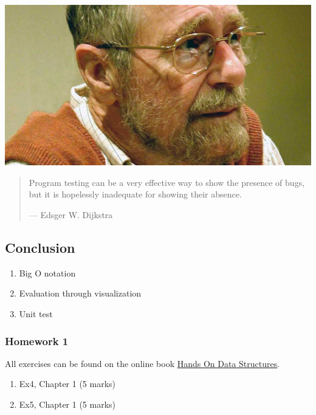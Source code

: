 \documentclass[aspectratio=169, 14pt]{beamer}
\begin{document}
\begin{frame}
    \begin{center}
        \includegraphics[height=.4\paperheight]{week2/dijkstra}
    \end{center}

   \begin{quote}
    Program testing can be a very effective way to show the presence of bugs, but it is hopelessly inadequate for showing their absence.
    \begin{flushright}
        --- Edsger W. Dijkstra
    \end{flushright}
   \end{quote} 

\end{frame}

\begin{frame}
    \section{\textcolor{darkmidnightblue}{Conclusion}}

    \begin{enumerate}
        \item Big O notation
        \item Evaluation through visualization
        \item Unit test
    \end{enumerate}
\end{frame}

\begin{frame}
    \frametitle{Homework 1}
All exercises can be found on the online book \href{https://chenzhongpu.github.io/data-structure-swufe/}{Hands On Data Structures}.    

\begin{enumerate}
    \item Ex4, Chapter 1 (5 marks)
    \item Ex5, Chapter 1 (5 marks)
\end{enumerate}
\end{frame}
\end{document}
